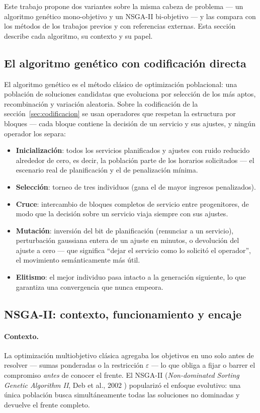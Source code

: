 \documentclass[11pt,a4paper]{article}
\begin{document}
Este trabajo propone dos variantes sobre la misma cabeza de problema ---
un algoritmo genético mono-objetivo y un NSGA-II bi-objetivo --- y las
compara con los métodos de los trabajos previos y con referencias externas.
Esta sección describe cada algoritmo, su contexto y su papel.

\subsection{El algoritmo genético con codificación directa}
\label{sec:ga}

El algoritmo genético es el método clásico de optimización poblacional:
una población de soluciones candidatas que evoluciona por selección de los
más aptos, recombinación y variación aleatoria. Sobre la codificación de la
sección~\ref{sec:codificacion} se usan operadores que respetan la
estructura por bloques --- cada bloque contiene la decisión de un servicio
y sus ajustes, y ningún operador los separa:

\begin{itemize}
\item \textbf{Inicialización}: todos los servicios planificados y ajustes
con ruido reducido alrededor de cero, es decir, la población parte de los
horarios solicitados --- el escenario real de planificación y el de
penalización mínima.
\item \textbf{Selección}: torneo de tres individuos (gana el de mayor
ingresos penalizados).
\item \textbf{Cruce}: intercambio de bloques completos de servicio entre
progenitores, de modo que la decisión sobre un servicio viaja siempre con
sus ajustes.
\item \textbf{Mutación}: inversión del bit de planificación (renunciar a un
servicio), perturbación gaussiana entera de un ajuste en minutos, o
devolución del ajuste a cero --- que significa ``dejar el servicio como lo
solicitó el operador'', el movimiento semánticamente más útil.
\item \textbf{Elitismo}: el mejor individuo pasa intacto a la generación
siguiente, lo que garantiza una convergencia que nunca empeora.
\end{itemize}

\subsection{NSGA-II: contexto, funcionamiento y encaje}
\label{sec:nsga2}

\paragraph{Contexto.} La optimización multiobjetivo clásica agregaba los
objetivos en uno solo antes de resolver --- sumas ponderadas o la
restricción $\varepsilon$ --- lo que obliga a fijar o barrer el compromiso
\emph{antes} de conocer el frente. El NSGA-II (\emph{Non-dominated Sorting
Genetic Algorithm II}, Deb et al., 2002 \cite{deb2002}) popularizó el
enfoque evolutivo: una única población busca simultáneamente todas las
soluciones no dominadas y devuelve el frente completo.
\end{document}
